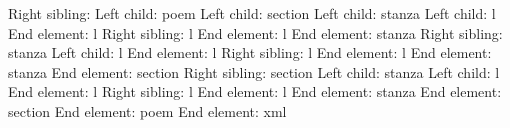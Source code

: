 Right sibling: 
Left child: poem
Left child: section
Left child: stanza
Left child: l
End element: l
Right sibling: l
End element: l
End element: stanza
Right sibling: stanza
Left child: l
End element: l
Right sibling: l
End element: l
End element: stanza
End element: section
Right sibling: section
Left child: stanza
Left child: l
End element: l
Right sibling: l
End element: l
End element: stanza
End element: section
End element: poem
End element: xml

